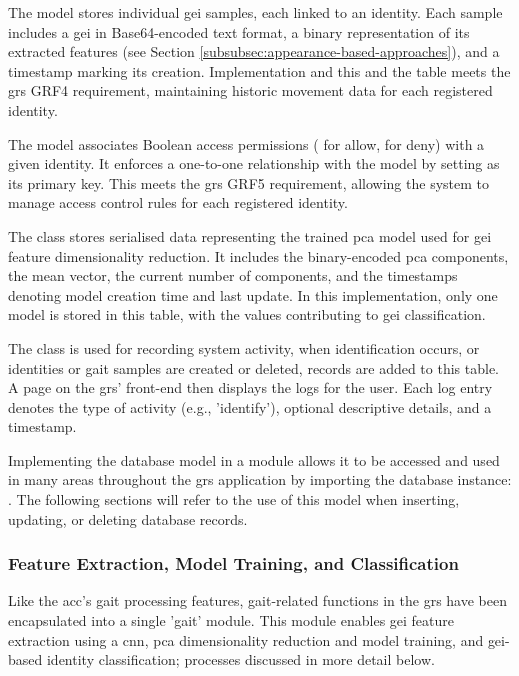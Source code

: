 The  model stores individual \ac{gei} samples, each linked to an identity.
Each sample includes a \ac{gei} in Base64-encoded text format, a binary representation of its extracted features (see Section \ref{subsubsec:appearance-based-approaches}), and a timestamp marking its creation.
Implementation and this and the  table meets the \ac{grs} GRF4 requirement, maintaining historic movement data for each registered identity.

The  model associates Boolean access permissions ( for allow,  for deny) with a given identity. It enforces a one-to-one relationship with the  model by setting  as its primary key. This meets the \ac{grs} GRF5 requirement, allowing the system to manage access control rules for each registered identity.

The  class stores serialised data representing the trained \ac{pca} model used for \ac{gei} feature dimensionality reduction. It includes the binary-encoded \ac{pca} components, the mean vector, the current number of components, and the timestamps denoting model creation time and last update. In this implementation, only one model is stored in this table, with the values contributing to \ac{gei} classification.

The  class is used for recording system activity, when identification occurs, or identities or gait samples are created or deleted, records are added to this table.
A page on the \ac{grs}' front-end then displays the logs for the user. Each log entry denotes the type of activity (e.g., 'identify'), optional descriptive details, and a timestamp.

Implementing the database model in a module allows it to be accessed and used in many areas throughout the \ac{grs} application by importing the database instance: . 
The following sections will refer to the use of this model when inserting, updating, or deleting database records.

\subsubsection{Feature Extraction, Model Training, and Classification}
\label{subsubsec:feature-extraction-model-training-and-classification}

Like the \ac{acc}'s gait processing features, gait-related functions in the \ac{grs} have been encapsulated into a single 'gait' module.
This module enables \ac{gei} feature extraction using a \ac{cnn}, \ac{pca} dimensionality reduction and model training, and \ac{gei}-based identity classification; processes discussed in more detail below.

